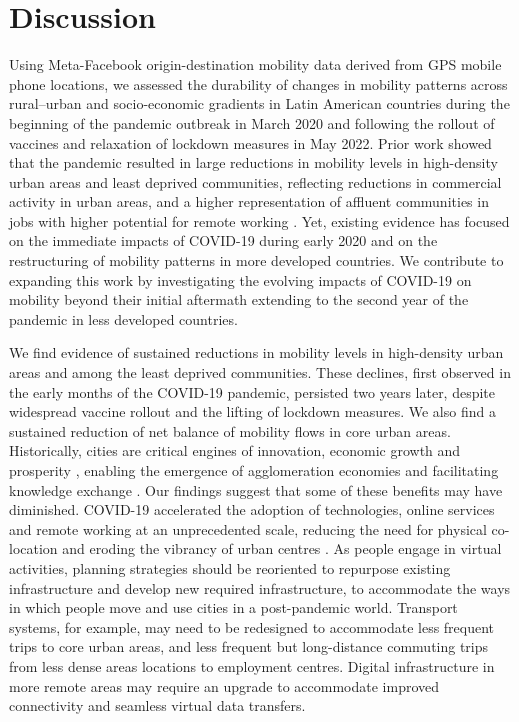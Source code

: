 \documentclass[fleqn,10pt]{wlscirep}
\begin{document}
\section*{Discussion}


Using Meta-Facebook origin-destination mobility data derived from GPS mobile phone locations, we assessed the durability of changes in mobility patterns across rural–urban and socio-economic gradients in Latin American countries during the beginning of the pandemic outbreak in March 2020 and following the rollout of vaccines and relaxation of lockdown measures in May 2022. Prior work showed that the pandemic resulted in large reductions in mobility levels in high-density urban areas and least deprived communities, reflecting reductions in commercial activity in urban areas, and a higher representation of affluent communities in jobs with higher potential for remote working \cite{bartik2020jobs}. Yet, existing evidence has focused on the immediate impacts of COVID-19 during early 2020 and on the restructuring of mobility patterns in more developed countries. We contribute to expanding this work by investigating the evolving impacts of COVID-19 on mobility beyond their initial aftermath extending to the second year of the pandemic in less developed countries.

We find evidence of sustained reductions in mobility levels in high-density urban areas and among the least deprived communities. These declines, first observed in the early months of the COVID-19 pandemic, persisted two years later, despite widespread vaccine rollout and the lifting of lockdown measures. We also find a sustained reduction of net balance of mobility flows in core urban areas. Historically, cities are critical engines of innovation, economic growth and prosperity \cite{Glaeser10}, enabling the emergence of agglomeration economies and facilitating knowledge exchange \cite{storper2004}. Our findings suggest that some of these benefits may have diminished. COVID-19 accelerated the adoption of technologies, online services and remote working at an unprecedented scale, reducing the need for physical co-location and eroding the vibrancy of urban centres \cite{Alexander21}. As people engage in virtual activities, planning strategies should be reoriented to repurpose existing infrastructure and develop new required infrastructure, to accommodate the ways in which people move and use cities in a post-pandemic world. Transport systems, for example, may need to be redesigned to accommodate less frequent trips to core urban areas, and less frequent but long-distance commuting trips from less dense areas locations to employment centres. Digital infrastructure in more remote areas may require an upgrade to accommodate improved connectivity and seamless virtual data transfers.
\end{document}
